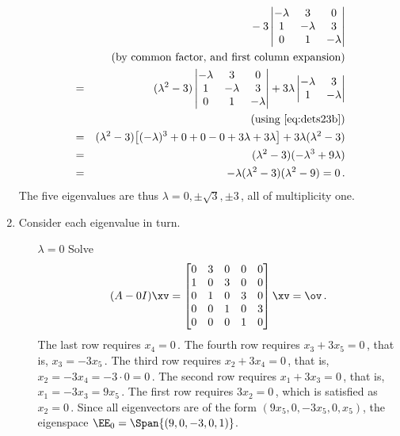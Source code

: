 \begin{example}
\begin{solution}
\begin{enumerate}
\begin{eqnarray*}
\\&&{}
-3\begin{vmatrix}-\lambda&3&0
\\1&-\lambda&3
\\0&1&-\lambda\end{vmatrix}
\\&&(\text{by common factor, and first column expansion})
\\&=&(\lambda^2-3)\begin{vmatrix}-\lambda&3&0
\\1&-\lambda&3
\\0&1&-\lambda\end{vmatrix}
+3\lambda\begin{vmatrix}-\lambda&3
\\1&-\lambda\end{vmatrix}
\\&&(\text{using~\eqref{eq:dets23b}})
\\&=&(\lambda^2-3)\big[(-\lambda)^3+0+0-0+3\lambda+3\lambda\big]
+3\lambda(\lambda^2-3)
\\&=&(\lambda^2-3)(-\lambda^3+9\lambda)
\\&=&-\lambda(\lambda^2-3)(\lambda^2-9)=0\,.
\end{eqnarray*}
The five eigenvalues are thus \(\lambda=0,\pm\sqrt3,\pm3\)\,, all of multiplicity one.

\item Consider each eigenvalue in turn.
\begin{itemize}
\item[\(\lambda=0\)]  Solve
\begin{equation*}
(A-0I)\xv=\begin{bmatrix}0&3&0&0&0
\\1&0&3&0&0
\\0&1&0&3&0
\\0&0&1&0&3
\\0&0&0&1&0\end{bmatrix}\xv=\ov\,.
\end{equation*}
The last row requires \(x_4=0\)\,.
The fourth row requires \(x_3+3x_5=0\)\,, that is, \(x_3=-3x_5\)\,.
The third row requires \(x_2+3x_4=0\)\,, that is, \(x_2=-3x_4=-3\cdot 0=0\)\,.
The second row requires \(x_1+3x_3=0\)\,, that is, \(x_1=-3x_3=9x_5\)\,.
The first row requires \(3x_2=0\)\,, which is satisfied as \(x_2=0\)\,.
Since all eigenvectors are of the form \((9x_5,0,-3x_5,0,x_5)\), the eigenspace \(\EE_0=\Span\{(9,0,-3,0,1)\}\).


\end{itemize}
\end{enumerate}
\end{solution}
\end{example}
